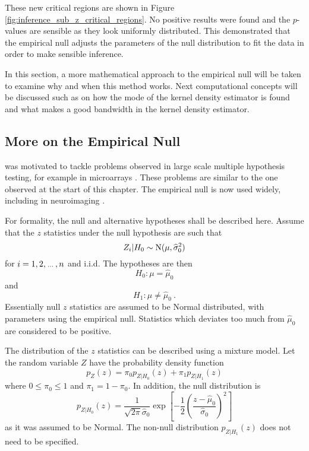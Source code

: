 These new critical regions are shown in Figure \ref{fig:inference_sub_z_critical_regions}. No positive results were found and the $p$-values are sensible as they look uniformly distributed. This demonstrated that the empirical null adjusts the parameters of the null distribution to fit the data in order to make sensible inference.

In this section, a more mathematical approach to the empirical null will be taken to examine why and when this method works. Next computational concepts will be discussed such as on how the mode of the kernel density estimator is found and what makes a good bandwidth in the kernel density estimator. 


\subsection{More on the Empirical Null}

\cite{efron2004large} was motivated to tackle problems observed in large scale multiple hypothesis testing, for example in microarrays \citep{hedenfalk2001gene, efron2002empirical, efron2003robbins}. These problems are similar to the one observed at the start of this chapter. The empirical null is now used widely, including in neuroimaging \citep{schwartzman2008false,schwartzman2009empirical}.

For formality, the null and alternative hypotheses shall be described here. Assume that the $z$ statistics under the null hypothesis are such that
\begin{equation}
	Z_i|H_0\sim\operatorname{N}(\mu,\widehat{\sigma}_0^2)
\end{equation}
for $i=1,2,\dotdotdot,n$ and i.i.d. The hypotheses are then
\begin{equation}
	H_0:\mu = \widehat{\mu}_0
\end{equation}
and
\begin{equation}
	H_1:\mu\neq\widehat{\mu}_0
	\ .
\end{equation}
Essentially null $z$ statistics are assumed to be Normal distributed, with parameters using the empirical null. Statistics which deviates too much from $\widehat{\mu}_0$ are considered to be positive.

The distribution of the $z$ statistics can be described using a mixture model. Let the random variable $Z$ have the probability density function
\begin{equation}
	p_Z(z) =
	\pi_0 p_{Z|H_0}(z) + \pi_1 p_{Z|H_1}(z)
\end{equation}
where $0\leqslant\pi_0\leqslant 1$ and  $\pi_1 = 1-\pi_0$. In addition, the null distribution is
\begin{equation}
	p_{Z|H_0}(z) = 
	\dfrac{1}{\sqrt{2\pi}\widehat{\sigma}_0}
	\exp\left[
		-\dfrac{1}{2}
		\left(
			\dfrac{z-\widehat{\mu}_0}{\widehat{\sigma}_0}
		\right)^2
	\right]
\end{equation}
as it was assumed to be Normal. The non-null distribution $p_{Z|H_1}(z)$ does not need to be specified.

